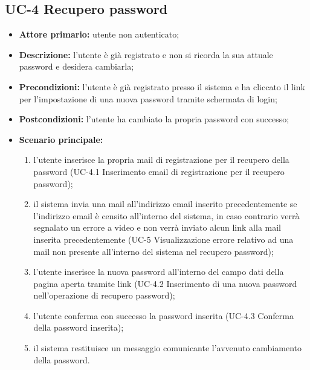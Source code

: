 \subsection{UC-4 Recupero password}
\begin{itemize}
	\item \textbf{Attore primario:} utente non autenticato;

	\item \textbf{Descrizione:} l'utente è già registrato e non si ricorda la sua attuale password e desidera cambiarla;

	\item \textbf{Precondizioni:} l'utente è già registrato presso il sistema e ha cliccato il link per l'impostazione di una nuova password tramite schermata di login;

	\item \textbf{Postcondizioni:} l'utente ha cambiato la propria password con successo;

	\item \textbf{Scenario principale:}
	      \begin{enumerate}
	      	      \item l'utente inserisce la propria mail di registrazione per il recupero della password (UC-4.1 Inserimento email di registrazione per il recupero password);
		      \item il sistema invia una mail all'indirizzo email inserito precedentemente se l'indirizzo email è censito all'interno del sistema, in caso contrario verrà segnalato un errore a video e non verrà inviato alcun link alla mail inserita precedentemente (UC-5 Visualizzazione errore relativo ad una mail non presente all'interno del sistema nel recupero password);
		      \item l'utente inserisce la nuova password all'interno del campo dati della pagina aperta tramite link (UC-4.2 Inserimento di una nuova password nell'operazione di recupero password);
		      \item l'utente conferma con successo la password inserita (UC-4.3 Conferma della password inserita);
		      \item il sistema restituisce un messaggio comunicante l'avvenuto cambiamento della password.
	      \end{enumerate}
\end{itemize}

